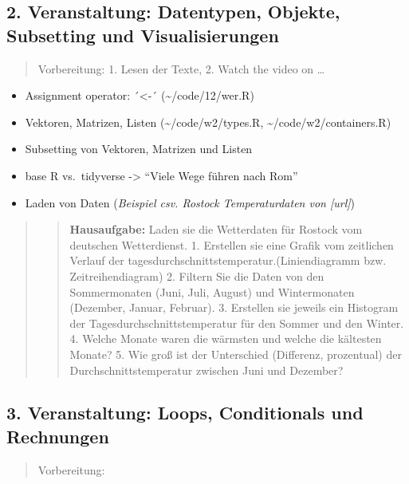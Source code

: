 \subsection{2. Veranstaltung: Datentypen, Objekte, Subsetting und
Visualisierungen}\label{veranstaltung-datentypen-objekte-subsetting-und-visualisierungen}

\begin{quote}
Vorbereitung: 1. Lesen der Texte, 2. Watch the video on \ldots{}
\end{quote}

\begin{itemize}
\tightlist
\item
  Assignment operator: ´\textless-´ (\textasciitilde/code/12/wer.R)
\item
  Vektoren, Matrizen, Listen (\textasciitilde/code/w2/types.R,
  \textasciitilde/code/w2/containers.R)
\item
  Subsetting von Vektoren, Matrizen und Listen
\item
  base R vs.~tidyverse -\textgreater{} ``Viele Wege führen nach Rom''
\item
  Laden von Daten (\emph{Beispiel csv. Rostock Temperaturdaten von
  {[}url{]}})
\end{itemize}

\begin{quote}
\begin{quote}
\textbf{Hausaufgabe:} Laden sie die Wetterdaten für Rostock vom
deutschen Wetterdienst. 1. Erstellen sie eine Grafik vom zeitlichen
Verlauf der tagesdurchschnittstemperatur.(Liniendiagramm bzw.
Zeitreihendiagram) 2. Filtern Sie die Daten von den Sommermonaten (Juni,
Juli, August) und Wintermonaten (Dezember, Januar, Februar). 3.
Erstellen sie jeweils ein Histogram der Tagesdurchschnittstemperatur für
den Sommer und den Winter. 4. Welche Monate waren die wärmsten und
welche die kältesten Monate? 5. Wie groß ist der Unterschied (Differenz,
prozentual) der Durchschnittstemperatur zwischen Juni und Dezember?
\end{quote}
\end{quote}

\subsection{3. Veranstaltung: Loops, Conditionals und
Rechnungen}\label{veranstaltung-loops-conditionals-und-rechnungen}

\begin{quote}
Vorbereitung:
\end{quote}

